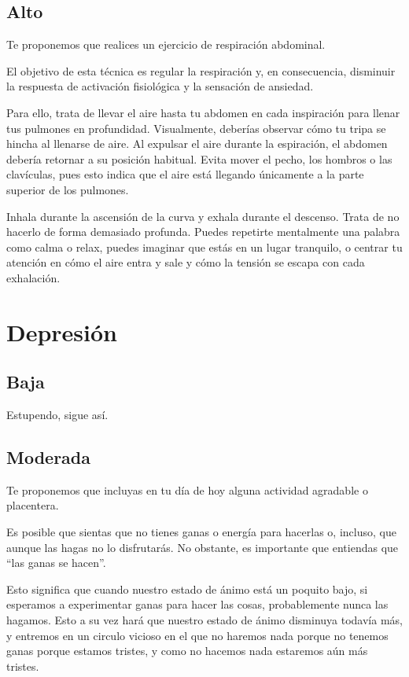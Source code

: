         \subsection{Alto}
            Te proponemos que realices un ejercicio de respiración abdominal. 

            El objetivo de esta técnica es regular la respiración y, en consecuencia, disminuir la respuesta de activación fisiológica y la sensación de ansiedad. 
            
            Para ello, trata de llevar el aire hasta tu abdomen en cada inspiración para llenar tus pulmones en profundidad. Visualmente, deberías observar cómo tu tripa se hincha al llenarse de aire. Al expulsar el aire durante la espiración, el abdomen debería retornar a su posición habitual. Evita mover el pecho, los hombros o las clavículas, pues esto indica que el aire está llegando únicamente a la parte superior de los pulmones.
            
            Inhala durante la ascensión de la curva y exhala durante el descenso. Trata de no hacerlo de forma demasiado profunda. Puedes repetirte mentalmente una palabra como calma o relax, puedes imaginar que estás en un lugar tranquilo, o centrar tu atención en cómo el aire entra y sale y cómo la tensión se escapa con cada exhalación. 
    
    \section{Depresión}
        \subsection{Baja}
            Estupendo, sigue así. 
        \subsection{Moderada}

            Te proponemos que incluyas en tu  día de hoy alguna actividad agradable o placentera. 
            
            Es posible que sientas que no tienes ganas o energía para hacerlas o, incluso, que aunque las hagas no lo disfrutarás. No obstante, es importante que entiendas que “las ganas se hacen”. 
            
            Esto significa que cuando nuestro estado de ánimo está un poquito bajo, si esperamos a experimentar ganas para hacer las cosas, probablemente nunca las hagamos. Esto a su vez hará que nuestro estado de ánimo disminuya todavía más, y entremos en un circulo vicioso en el que no haremos nada porque no tenemos ganas porque estamos tristes, y como no hacemos nada estaremos aún más tristes. 
            

